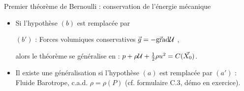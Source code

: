 \begin{frame}{Premier théorème de Bernoulli : conservation de l'énergie mécanique}
\begin{itemize}

\pause
\item Si l'hypothèse $(b)$ est remplacée par 

$(b')$ : Forces volumiques conservatives  $\vec{g} = - \vec{\mbox{\rm gra}}\mbox{\rm d} {\cal U} $ , 

alors le théorème se généralise en :  
$p + \rho {\cal U} + \frac{1}{2} \rho u^2  = C(\vec{X_0})$. 
\pause
\item Il existe une généralisation si l'hypothèse $(a)$ est remplacée par 
$(a')$ : Fluide Barotrope,
c.a.d. $\rho = \rho(P)$ (cf. formulaire C.3, démo en exercice).

\end{itemize}


\end{frame}







